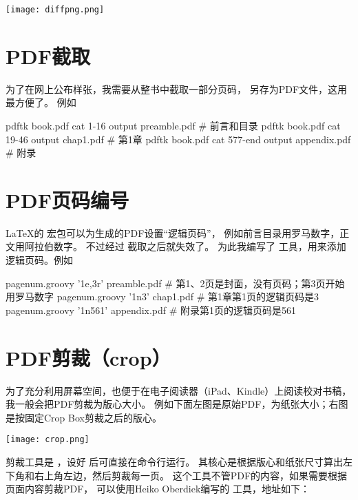 \vspace{1ex}
\centerline{\texttt{[image: diffpng.png]}}

\section{PDF截取}
为了在网上公布样张，我需要从整书中截取一部分页码，
另存为PDF文件，这用  最方便了。
例如
\begin{Code}
pdftk book.pdf cat 1-16 output preamble.pdf     # 前言和目录
pdftk book.pdf cat 19-46 output chap1.pdf       # 第1章
pdftk book.pdf cat 577-end output appendix.pdf  # 附录
\end{Code}


\section{PDF页码编号}

\LaTeX 的  宏包可以为生成的PDF设置“逻辑页码”，
例如前言目录用罗马数字，正文用阿拉伯数字。
不过经过  截取之后就失效了。
为此我编写了  工具，用来添加逻辑页码。例如
\begin{Code}
pagenum.groovy '1e,3r' preamble.pdf  # 第1、2页是封面，没有页码；第3页开始用罗马数字
pagenum.groovy '1n3'   chap1.pdf     # 第1章第1页的逻辑页码是3
pagenum.groovy '1n561' appendix.pdf  # 附录第1页的逻辑页码是561
\end{Code}


\section{PDF剪裁（crop）}
为了充分利用屏幕空间，也便于在电子阅读器（iPad、Kindle）上阅读校对书稿，
我一般会把PDF剪裁为版心大小。
例如下面左图是原始PDF，为纸张大小；右图是按固定Crop Box剪裁之后的版心。

\vspace{1ex}
\centerline{\texttt{[image: crop.png]}}

剪裁工具是 ，设好  后可直接在命令行运行。
其核心是根据版心和纸张尺寸算出左下角和右上角左边，然后剪裁每一页。
这个工具不管PDF的内容，如果需要根据页面内容剪裁PDF，
可以使用Heiko Oberdiek编写的  工具，地址如下：

\begindot
\item {}
\item {}
\myenddot

